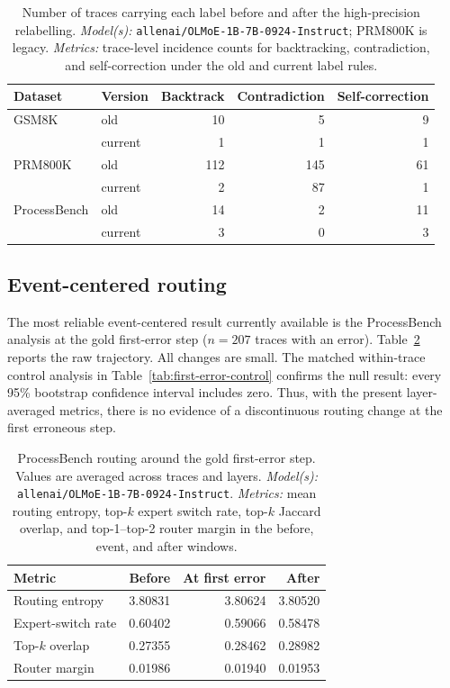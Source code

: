 \documentclass[manuscript,screen,review]{jair}
\newcommand{\modelmetrics}[2]{\textit{Model(s):} #1. \textit{Metrics:} #2.}
\begin{document}
\begin{table}[t]
\centering
\caption{Number of traces carrying each label before and after the
high-precision relabelling.  \modelmetrics{
\texttt{allenai/OLMoE-1B-7B-0924-Instruct}; PRM800K is legacy}{trace-level
incidence counts for backtracking, contradiction, and self-correction under
the old and current label rules}}
\label{tab:relabel-audit}
\begin{tabular}{llrrr}
\toprule
Dataset & Version & Backtrack & Contradiction & Self-correction \\
\midrule
GSM8K & old & 10 & 5 & 9 \\
      & current & 1 & 1 & 1 \\
PRM800K & old & 112 & 145 & 61 \\
        & current & 2 & 87 & 1 \\
ProcessBench & old & 14 & 2 & 11 \\
             & current & 3 & 0 & 3 \\
\bottomrule
\end{tabular}
\end{table}

\subsection{Event-centered routing}

The most reliable event-centered result currently available is the
ProcessBench analysis at the gold first-error step ($n=207$ traces with an
error).  Table~\ref{tab:first-error-routing} reports the raw trajectory.  All
changes are small.  The matched within-trace control analysis in
Table~\ref{tab:first-error-control} confirms the null result: every 95\%
bootstrap confidence interval includes zero.  Thus, with the present
layer-averaged metrics, there is no evidence of a discontinuous routing change
at the first erroneous step.

\begin{table}[t]
\centering
\caption{ProcessBench routing around the gold first-error step. Values are
averaged across traces and layers.  \modelmetrics{
\texttt{allenai/OLMoE-1B-7B-0924-Instruct}}{mean routing entropy, top-$k$
expert switch rate, top-$k$ Jaccard overlap, and top-1--top-2 router margin in
the before, event, and after windows}}
\label{tab:first-error-routing}
\begin{tabular}{lrrr}
\toprule
Metric & Before & At first error & After \\
\midrule
Routing entropy    & 3.80831 & 3.80624 & 3.80520 \\
Expert-switch rate & 0.60402 & 0.59066 & 0.58478 \\
Top-$k$ overlap    & 0.27355 & 0.28462 & 0.28982 \\
Router margin      & 0.01986 & 0.01940 & 0.01953 \\
\bottomrule
\end{tabular}
\end{table}
\end{document}
